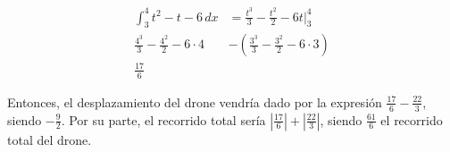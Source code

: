 \begin{align*}
    \int_{3}^{4} t^2 - t - 6 \,dx &= \frac{t^3}{3} - \frac{t^2}{2} - 6t \Big|_3^4\\
    \frac{4^3}{3} - \frac{4^2}{2} - 6 \cdot 4 &- \left( \frac{3^3}{3} - \frac{3^2}{2} - 6 \cdot 3 \right)\\
    \frac{17}{6}
\end{align*}

Entonces, el desplazamiento del drone vendría dado por la expresión $\frac{17}{6} - \frac{22}{3}$, siendo $- \frac{9}{2}$. Por su parte, el recorrido total sería $|\frac{17}{6}| + |\frac{22}{3}|$, siendo $\frac{61}{6}$ el recorrido total del drone.